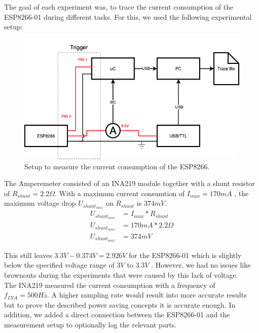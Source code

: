 The goal of each experiment was, to trace the current consumption of the ESP8266-01 during different tasks.
For this, we used the following experimental setup:

\begin{figure}[H]
    \centering
    \includegraphics[width = \linewidth]{fig/experimental_setup.png}
    \caption{Setup to measure the current consumption of the ESP8266.}
    \label{fig:experiment_setup}
\end{figure}

The Amperemeter consisted of an INA219 module together with a shunt resistor of $R_{shunt} = 2.2 \Omega$.
With a maximum current consumtion of $I_{max}=170 mA$ \cite{espressif_inc_esp8266_2016}, the maximum voltage drop $U_{shunt_{max}}$ on $R_{shunt}$ is $374mV$.
\begin{align*}
    U_{shunt_{max}} &= I_{max} * R_{shunt}\\
    U_{shunt_{max}} &= 170mA * 2.2 \Omega\\
    U_{shunt_{max}} &= 374mV
\end{align*}

This still leaves $3.3V - 0.374V = 2.926V$ for the ESP8266-01 which is slightly below the specified voltage range of $3V$ to $3.3V$ \cite{espressif_inc_esp8266_2016}.
However, we had no issues like brownouts during the experiments that were caused by this lack of voltage.\\
The INA219 measured the current consumption with a frequency of $f_{INA} = 500Hz$.
A higher sampling rate would result into more accurate results but to prove the
described power saving concepts it is accurate enough.
In addition, we added a direct connection between the ESP8266-01 and the measurement setup to optionally log the relevant parts.

